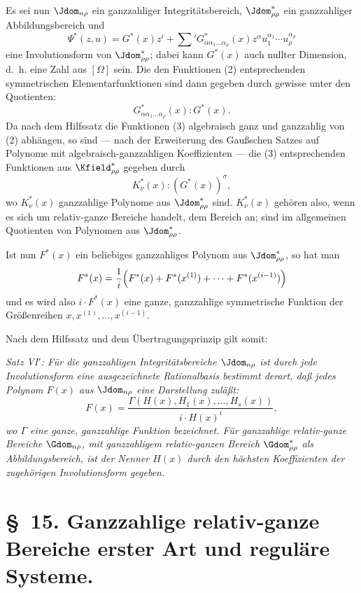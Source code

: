 \documentclass[11pt]{article}
\begin{document}
Es sei nun $\Jdom_{n\rho}$ ein ganzzahliger Integritätsbereich, $\Jdom^*_{\rho\rho}$ ein ganzzahliger Abbildungsbereich und
\[
  \Psi^*(z,u)=G^*(x)z^i+
  \sum{}'G^*_{\alpha\alpha_1\ldots\alpha_\rho}(x)
  z^\alpha u_1^{\alpha_1}\cdots u_\rho^{\alpha_\rho}
\]
eine Involutionsform von $\Jdom^*_{\rho\rho}$; dabei kann $G^*(x)$ auch nullter Dimension, d.~h. eine Zahl aus $[\Omega]$ sein. Die den Funktionen (2) entsprechenden symmetrischen Elementarfunktionen sind dann gegeben durch gewisse unter den Quotienten:
\begin{equation}
  G^*_{\alpha\alpha_1\ldots\alpha_\rho}(x):G^*(x).
\tag{4}
\end{equation}
Da nach dem Hilfssatz die Funktionen (3) algebraisch ganz und ganzzahlig von (2) abhängen, so sind --- nach der Erweiterung des Gaußschen Satzes auf Polynome mit algebraisch-ganzzahligen Koeffizienten --- die (3) entsprechenden Funktionen aus $\Kfield^*_{\rho\rho}$ gegeben durch
\begin{equation}
  K_\nu^*(x):(G^*(x))^\sigma,
\tag{5}
\end{equation}
wo $K_\nu^*(x)$ ganzzahlige Polynome aus $\Jdom^*_{\rho\rho}$ sind. $K_\nu^*(x)$ gehören also, wenn es sich um relativ-ganze Bereiche handelt, dem Bereich an; sind im allgemeinen Quotienten von Polynomen aus $\Jdom^*_{\rho\rho}$.

Ist nun $F^*(x)$ ein beliebiges ganzzahliges Polynom aus $\Jdom^*_{\rho\rho}$, so hat man
\[
  F^*(x)=\frac1i\Bigl(F^*(x)+F^*(x^{(1)})+\cdots+F^*(x^{(i-1)})\Bigr)
\]
und es wird also $i\cdot F^*(x)$ eine ganze, ganzzahlige symmetrische Funktion der Größenreihen $x,x^{(1)},\ldots,x^{(i-1)}$.

Nach dem Hilfssatz und dem Übertragungsprinzip gilt somit:

\emph{Satz VI$'$: Für die ganzzahligen Integritätsbereiche $\Jdom_{n\rho}$ ist durch jede Involutionsform eine ausgezeichnete Rationalbasis bestimmt derart, daß jedes Polynom $F(x)$ aus $\Jdom_{n\rho}$ eine Darstellung zuläßt:}
\[
  F(x)=\frac{\Gamma(H(x),H_1(x),\ldots,H_s(x))}{i\cdot H(x)^i},
\]
\emph{wo $\Gamma$ eine ganze, ganzzahlige Funktion bezeichnet. Für ganzzahlige relativ-ganze Bereiche $\Gdom_{n\rho}$, mit ganzzahligem relativ-ganzen Bereich $\Gdom^*_{\rho\rho}$ als Abbildungsbereich, ist der Nenner $H(x)$ durch den höchsten Koeffizienten der zugehörigen Involutionsform gegeben.}

\section*{\S\ 15. Ganzzahlige relativ-ganze Bereiche erster Art und reguläre Systeme.}
\end{document}
